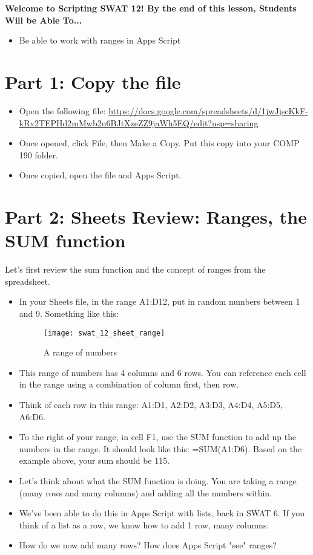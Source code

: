 \documentclass{article}
\newcommand{\AName}{Scripting SWAT 12}
\begin{document}
\textbf{Welcome to \AName!  By the end of this lesson, Students Will be Able To...}
\begin{itemize}
    \item Be able to work with ranges in Apps Script
\end{itemize}


\section*{Part 1: Copy the file}
\begin{itemize}
    \item Open the following file:  \url{https://docs.google.com/spreadsheets/d/1jwJjscKkF-kRx2TEPHd2mMwb2u6BJtXzeZZ9jaWh5EQ/edit?usp=sharing}
    \item Once opened, click File, then Make a Copy.  Put this copy into your COMP 190 folder.
    \item Once copied, open the file and Apps Script.
\end{itemize}

\section*{Part 2: Sheets Review:  Ranges, the SUM function}
Let's first review the sum function and the concept of ranges from the spreadsheet.
\begin{itemize}
    \item In your Sheets file, in the range A1:D12, put in random numbers between 1 and 9.  Something like this:
    \begin{figure}[H]
  		\centering
  		\texttt{[image: swat\_12\_sheet\_range]}
  		\caption{A range of numbers}
	\end{figure}
	\item This range of numbers has 4 columns and 6 rows.  You can reference each cell in the range using a combination of column first, then row.
	\item Think of each row in this range:  A1:D1, A2:D2, A3:D3, A4:D4, A5:D5, A6:D6.
	\item To the right of your range, in cell F1, use the SUM function to add up the numbers in the range.  It should look like this: =SUM(A1:D6).  Based on the example above, your sum should be 115.
	\item Let's think about what the SUM function is doing.  You are taking a range (many rows and many columns) and adding all the numbers within.
	\item We've been able to do this in Apps Script with lists, back in SWAT 6.  If you think of a list as a row, we know how to add 1 row, many columns.
	\item How do we now add many rows?  How does Apps Script "see" ranges?
\end{itemize}
\end{document}
